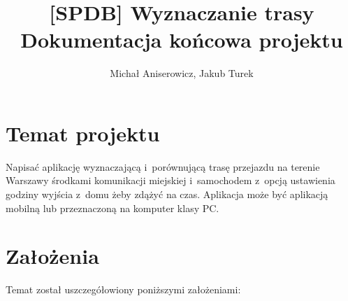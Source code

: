 \documentclass[a4paper,12pt]{article}
\title{\LARGE{[SPDB] Wyznaczanie trasy} \\ \vspace{2mm} \large{Dokumentacja końcowa projektu}}
\author{Michał Aniserowicz, Jakub Turek}
\date{}
\begin{document}
	\maketitle

	\VerbatimFootnotes

	\section*{Temat projektu}

	Napisać aplikację wyznaczającą i~porównującą trasę przejazdu na terenie Warszawy środkami komunikacji miejskiej i~samochodem z~opcją ustawienia godziny wyjścia z~domu żeby zdążyć na czas. Aplikacja może być aplikacją mobilną lub przeznaczoną na komputer klasy PC.

	\section*{Założenia}

	Temat został uszczegółowiony poniższymi założeniami:
\end{document}
